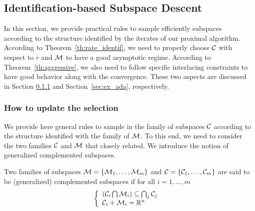 \subsection{Identification-based Subspace Descent}\label{sec:adapt}

{
In this section, we provide practical rules to sample efficiently subspaces according to the structure identified by the iterates of our proximal algorithm. According to Theorem~\ref{th:rate_identif}, we need to properly choose $\mathcal{C}$ with respect to $r$ and $\mathcal{M}$ to have a good asymptotic regime. According to Theorem~\ref{th:aggressive},  we also need to follow specific interlacing constraints to have good behavior along with the convergence. These two aspects are discussed in Section \ref{sec:howto} and Section~\ref{sec:ex_ada}, respectively.}


\subsubsection{How to update the selection}
\label{sec:howto}

We provide here general rules to sample in the family of subspaces $\mathcal{C}$ according to the structure identified with the family of $\mathcal{M}$.
To this end, we need to consider the two families $\mathcal{C}$ and $\mathcal{M}$ that closely related. We introduce the notion of generalized {complemented subspaces}.

\begin{definition}
Two families of subspaces $\mathcal{M} = \{ \mathcal{M}_1,\ldots,\mathcal{M}_m\}$ and 
$\mathcal{C} = \{ \mathcal{C}_1,\ldots,\mathcal{C}_m\}$ are said to be (generalized)  {complemented subspaces} if for all $i=1,\ldots,m$
\[
  \left\{ \begin{array}{l}
    \left( \mathcal{C}_i \bigcap  \mathcal{M}_i  \right) \subseteq  \bigcap_j \mathcal{C}_j  \\
      \mathcal{C}_i  +  \mathcal{M}_i = \mathbb{R}^n
  \end{array} \right. 
\]
\end{definition}

